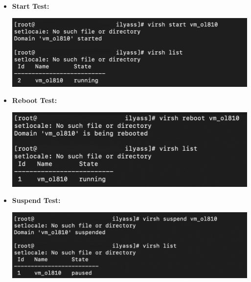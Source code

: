\begin{itemize}
    \item \textbf{Start Test:}
          \begin{center}
              \includegraphics[width=\linewidth]{Images/Start using libvirt.png}
              \label{fig:reboot}
          \end{center}

    \item \textbf{Reboot Test:}
          \begin{center}
              \includegraphics[width=\linewidth]{Images/Reboot using libvirt.png}
              \label{fig:reboot}
          \end{center}

    \item \textbf{Suspend Test:}
          \begin{center}
              \includegraphics[width=\linewidth]{Images/Suspend using libvirt.png}
              \label{fig:areboot}
          \end{center}


\end{itemize}
